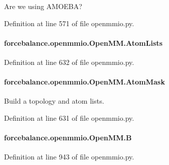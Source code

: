Are we using A\-M\-O\-E\-B\-A? 



Definition at line 571 of file openmmio.\-py.

\hypertarget{classforcebalance_1_1openmmio_1_1OpenMM_a4dc04cc62a82997528627c6050235a64}{
\paragraph[{Atom\-Lists}]{\setlength{\rightskip}{0pt plus 5cm}forcebalance.\-openmmio.\-Open\-M\-M.\-Atom\-Lists}}\label{classforcebalance_1_1openmmio_1_1OpenMM_a4dc04cc62a82997528627c6050235a64}


Definition at line 632 of file openmmio.\-py.

\hypertarget{classforcebalance_1_1openmmio_1_1OpenMM_ab8bbe3c82b157183b54c67f3973cb2ea}{
\paragraph[{Atom\-Mask}]{\setlength{\rightskip}{0pt plus 5cm}forcebalance.\-openmmio.\-Open\-M\-M.\-Atom\-Mask}}\label{classforcebalance_1_1openmmio_1_1OpenMM_ab8bbe3c82b157183b54c67f3973cb2ea}


Build a topology and atom lists. 



Definition at line 631 of file openmmio.\-py.

\hypertarget{classforcebalance_1_1openmmio_1_1OpenMM_ae96e5d45681a34fbda6781d27845409c}{
\paragraph[{B}]{\setlength{\rightskip}{0pt plus 5cm}forcebalance.\-openmmio.\-Open\-M\-M.\-B}}\label{classforcebalance_1_1openmmio_1_1OpenMM_ae96e5d45681a34fbda6781d27845409c}


Definition at line 943 of file openmmio.\-py.

